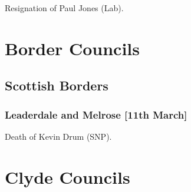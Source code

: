\documentclass[a4paper,openany]{book}
\begin{document}
\begin{resultsiii}

Resignation of Paul Jones (Lab).

\section{Border Councils}

\subsection*{Scottish Borders}

\subsubsection*{Leaderdale and Melrose \hspace*{\fill}\nolinebreak[1]%
	\enspace\hspace*{\fill}
	[11th March]}


Death of Kevin Drum (SNP).

%
%

\section{Clyde Councils}


\end{resultsiii}
\end{document}
